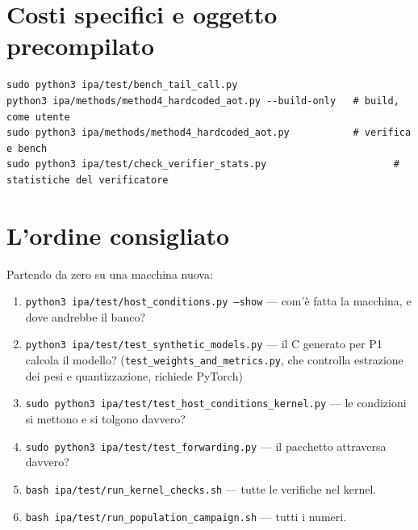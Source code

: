 \documentclass[11pt,a4paper,oneside]{report}
\begin{document}
\section{Costi specifici e oggetto precompilato}

\begin{lstlisting}
sudo python3 ipa/test/bench_tail_call.py
python3 ipa/methods/method4_hardcoded_aot.py --build-only   # build, come utente
sudo python3 ipa/methods/method4_hardcoded_aot.py           # verifica e bench
sudo python3 ipa/test/check_verifier_stats.py                      # statistiche del verificatore
\end{lstlisting}

\section{L'ordine consigliato}

Partendo da zero su una macchina nuova:

\begin{enumerate}
\item \texttt{python3 ipa/test/host\_conditions.py --show} --- com'è fatta la
      macchina, e dove andrebbe il banco?
\item \texttt{python3 ipa/test/test\_synthetic\_models.py} --- il C generato per P1 calcola il modello? (\texttt{test\_weights\_and\_metrics.py}, che controlla estrazione dei pesi e quantizzazione, richiede PyTorch)
\item \texttt{sudo python3 ipa/test/test\_host\_conditions\_kernel.py} --- le
      condizioni si mettono e si tolgono davvero?
\item \texttt{sudo python3 ipa/test/test\_forwarding.py} --- il pacchetto
      attraversa davvero?
\item \texttt{bash ipa/test/run\_kernel\_checks.sh} --- tutte le verifiche nel kernel.
\item \texttt{bash ipa/test/run\_population\_campaign.sh} --- tutti i numeri.
\end{enumerate}
\end{document}
